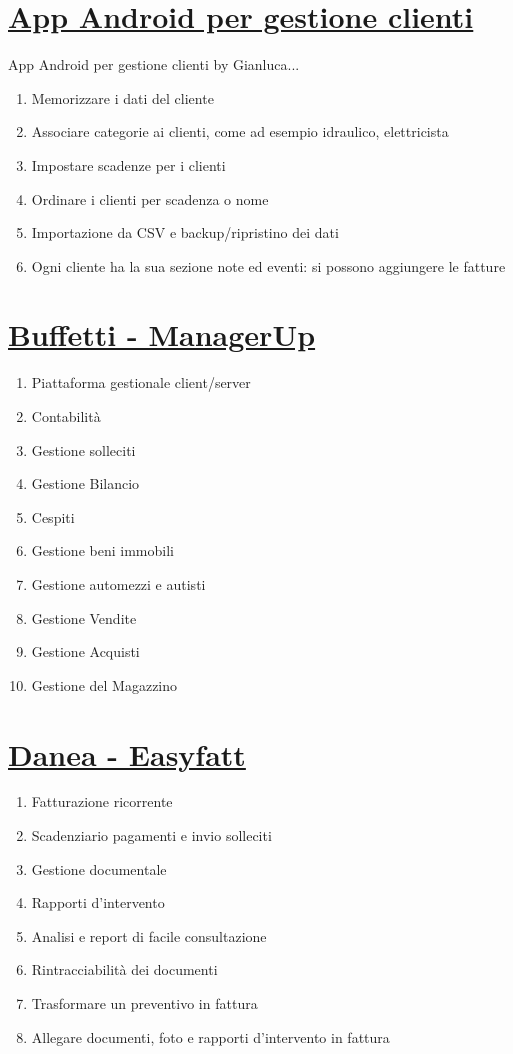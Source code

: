 \documentclass[11pt]{article}
\begin{document}
\section{\href{https://www.gianlucaghettini.net/app-android-per-gestione-clienti/}{App Android per gestione clienti}}

App Android per gestione clienti by Gianluca...
\begin{enumerate}
  \item Memorizzare i dati del cliente
  \item Associare categorie ai clienti, come ad esempio idraulico, elettricista
  \item Impostare scadenze per i clienti
  \item Ordinare i clienti per scadenza o nome
  \item Importazione da CSV e backup/ripristino dei dati
  \item  Ogni cliente ha la sua sezione note ed eventi: si possono aggiungere le fatture
\end{enumerate}

\section{\href{https://buffetti.it/software-gestionale/aziende/linea-azienda/manager-up/}{Buffetti - ManagerUp}}


\begin{enumerate}
\item Piattaforma gestionale client/server
\item Contabilità
\item Gestione solleciti
\item Gestione Bilancio
\item Cespiti
\item Gestione beni immobili
\item Gestione automezzi e autisti
\item Gestione Vendite
\item Gestione Acquisti
\item Gestione del Magazzino
\end{enumerate}

\section{\href{https://www.danea.it/software/easyfatt/}{Danea - Easyfatt}}

\begin{enumerate}
\item Fatturazione ricorrente
\item Scadenziario pagamenti e invio solleciti
\item Gestione documentale
\item Rapporti d'intervento
\item Analisi e report di facile consultazione
\item Rintracciabilità dei documenti
\item Trasformare un preventivo in fattura
\item Allegare documenti, foto e rapporti d'intervento in fattura
\end{enumerate}
\end{document}
